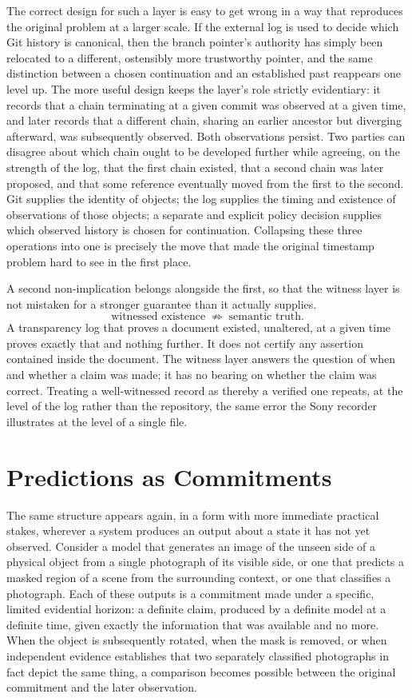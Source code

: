 \documentclass[11pt]{article}
\begin{document}
The correct design for such a layer is easy to get wrong in a way that reproduces the original problem at a larger scale. If the external log is used to decide which Git history is canonical, then the branch pointer's authority has simply been relocated to a different, ostensibly more trustworthy pointer, and the same distinction between a chosen continuation and an established past reappears one level up. The more useful design keeps the layer's role strictly evidentiary: it records that a chain terminating at a given commit was observed at a given time, and later records that a different chain, sharing an earlier ancestor but diverging afterward, was subsequently observed. Both observations persist. Two parties can disagree about which chain ought to be developed further while agreeing, on the strength of the log, that the first chain existed, that a second chain was later proposed, and that some reference eventually moved from the first to the second. Git supplies the identity of objects; the log supplies the timing and existence of observations of those objects; a separate and explicit policy decision supplies which observed history is chosen for continuation. Collapsing these three operations into one is precisely the move that made the original timestamp problem hard to see in the first place.

A second non-implication belongs alongside the first, so that the witness layer is not mistaken for a stronger guarantee than it actually supplies.
\[
\boxed{\text{witnessed existence} \;\not\Rightarrow\; \text{semantic truth}.}
\]
A transparency log that proves a document existed, unaltered, at a given time proves exactly that and nothing further. It does not certify any assertion contained inside the document. The witness layer answers the question of when and whether a claim was made; it has no bearing on whether the claim was correct. Treating a well-witnessed record as thereby a verified one repeats, at the level of the log rather than the repository, the same error the Sony recorder illustrates at the level of a single file.

\section{Predictions as Commitments}

The same structure appears again, in a form with more immediate practical stakes, wherever a system produces an output about a state it has not yet observed. Consider a model that generates an image of the unseen side of a physical object from a single photograph of its visible side, or one that predicts a masked region of a scene from the surrounding context, or one that classifies a photograph. Each of these outputs is a commitment made under a specific, limited evidential horizon: a definite claim, produced by a definite model at a definite time, given exactly the information that was available and no more. When the object is subsequently rotated, when the mask is removed, or when independent evidence establishes that two separately classified photographs in fact depict the same thing, a comparison becomes possible between the original commitment and the later observation.
\end{document}
